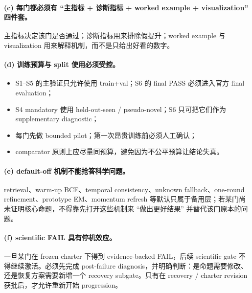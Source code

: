 \documentclass[UTF8]{ctexart}
\begin{document}
\paragraph{(c) 每门都必须有 ``主指标 + 诊断指标 + worked example + visualization'' 四件套。}
主指标决定该门是否通过；诊断指标用来排除假提升；worked example 与 visualization 用来解释机制，而不是只给出好看的数字。

\paragraph{(d) 训练预算与 split 使用必须受控。}
\begin{itemize}
\item S1--S5 的主验证只允许使用 train+val；S6 的 final PASS 必须进入官方 final evaluation；
\item S4 mandatory 使用 held-out-seen / pseudo-novel；S6 只可把它们作为 supplementary diagnostic；
\item 每门先做 bounded pilot；第一次昂贵训练前必须人工确认；
\item comparator 原则上应尽量同预算，避免因为不公平预算让结论失真。
\end{itemize}

\paragraph{(e) default-off 机制不能抢答科学问题。}
retrieval、warm-up BCE、temporal consistency、unknown fallback、one-round refinement、prototype EM、momentum refresh 等默认只属于备用层；若某门尚未证明核心命题，不得靠先打开这些机制来 ``做出更好结果'' 并替代该门原本的问题。

\paragraph{(f) scientific FAIL 具有停机效应。}
一旦某门在 frozen charter 下得到 evidence-backed FAIL，后续 scientific gate 不得继续激活。必须先完成 post-failure diagnosis，并明确判断：是命题需要修改、还是恢复方案需要新增一个 recovery subgate。只有在 recovery / charter revision 获批后，才允许重新开始 progression。

\par\noindent\hrulefill\par
\end{document}
